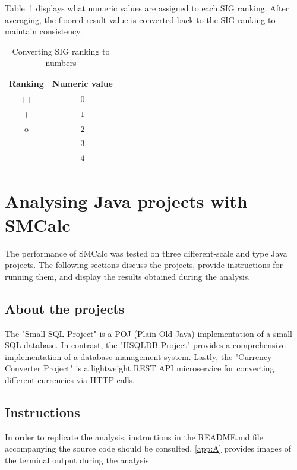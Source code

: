\documentclass[11pt]{report}
\begin{document}
Table~\ref{tab:sig-converter} displays what numeric values are assigned to each SIG ranking. After averaging, the floored result value is converted back to the SIG ranking to maintain consistency.

\begin{table}[H]
    \centering
    \begin{tabular}{|c|c|}
        \hline
        \textbf{Ranking} & \textbf{Numeric value} \\ \hline
        ++ & $0$ \\ \hline
        + & $1$ \\ \hline
        o & $2$ \\ \hline
        - & $3$ \\ \hline
        - - & $4$ \\ \hline
    \end{tabular}
    \caption{Converting SIG ranking to numbers}
    \label{tab:sig-converter}
\end{table}



\chapter{Analysing Java projects with SMCalc}
\label{chap:results}

The performance of SMCalc was tested on three different-scale and type Java projects. The following sections discuss the projects, provide instructions for running them, and display the results obtained during the analysis.

\section{About the projects}
\label{sec:about-projects}

The "Small SQL Project" is a POJ (Plain Old Java) implementation of a small SQL database. In contrast, the "HSQLDB Project" provides a comprehensive implementation of a database management system. Lastly, the "Currency Converter Project" is a lightweight REST API microservice for converting different currencies via HTTP calls.

\section{Instructions}
\label{sec:instructions}

In order to replicate the analysis, instructions in the README.md file accompanying the source code should be consulted. \autoref{app:A} provides images of the terminal output during the analysis.
\end{document}
